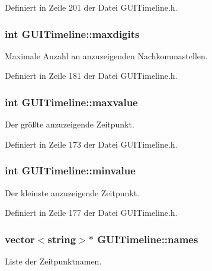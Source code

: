 Definiert in Zeile 201 der Datei G\-U\-I\-Timeline.\-h.

\hypertarget{classGUITimeline_a880c85a1838b77e7dd2c03601c15e36b}{
\subsubsection[{maxdigits}]{\setlength{\rightskip}{0pt plus 5cm}int G\-U\-I\-Timeline\-::maxdigits\hspace{0.3cm}{\ttfamily [private]}}}\label{classGUITimeline_a880c85a1838b77e7dd2c03601c15e36b}
Maximale Anzahl an anzuzeigenden Nachkommastellen. 

Definiert in Zeile 181 der Datei G\-U\-I\-Timeline.\-h.

\hypertarget{classGUITimeline_a6c639803db9c5afff38d3221242da912}{
\subsubsection[{maxvalue}]{\setlength{\rightskip}{0pt plus 5cm}int G\-U\-I\-Timeline\-::maxvalue\hspace{0.3cm}{\ttfamily [private]}}}\label{classGUITimeline_a6c639803db9c5afff38d3221242da912}
Der größte anzuzeigende Zeitpunkt. 

Definiert in Zeile 173 der Datei G\-U\-I\-Timeline.\-h.

\hypertarget{classGUITimeline_aad9f2b796d0d7c086cfe0094b3ef10c5}{
\subsubsection[{minvalue}]{\setlength{\rightskip}{0pt plus 5cm}int G\-U\-I\-Timeline\-::minvalue\hspace{0.3cm}{\ttfamily [private]}}}\label{classGUITimeline_aad9f2b796d0d7c086cfe0094b3ef10c5}
Der kleinste anzuzeigende Zeitpunkt. 

Definiert in Zeile 177 der Datei G\-U\-I\-Timeline.\-h.

\hypertarget{classGUITimeline_adcdd8d58db7851c24ab9dfdfe1377ffb}{
\subsubsection[{names}]{\setlength{\rightskip}{0pt plus 5cm}vector$<$string$>$$\ast$ G\-U\-I\-Timeline\-::names\hspace{0.3cm}{\ttfamily [private]}}}\label{classGUITimeline_adcdd8d58db7851c24ab9dfdfe1377ffb}
Liste der Zeitpunktnamen. 

